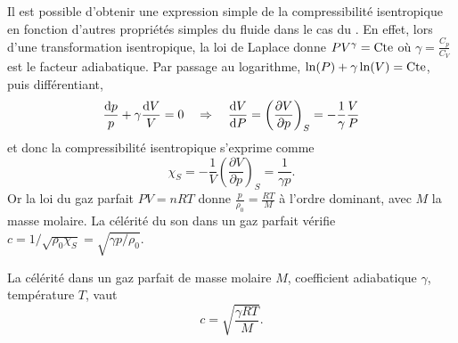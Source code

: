 \documentclass[12pt,fancy]{cours}
\begin{document}
Il est possible d'obtenir une expression simple de la compressibilité isentropique en fonction d'autres propriétés simples du fluide dans le cas du . En effet, lors d'une transformation isentropique, la loi de Laplace donne $PV^{\gamma}=\text{Cte}$ où $\gamma=\frac{C_p}{C_V}$ est le facteur adiabatique. Par passage au logarithme, $\ln(P)+\gamma\ln(V)=\text{Cte}$, puis différentiant,
\begin{equation}
\frac{\mathrm{d} p}{p}+\gamma\frac{\mathrm{d} V}{V}=0\quad\Rightarrow \quad \frac{\mathrm{d} V}{\mathrm{d} P}=\left(\frac{\partial V}{\partial p}\right)_{S}=-\frac{1}{\gamma}\frac{V}{P}
\end{equation}
et donc la compressibilité isentropique s'exprime comme
\begin{equation}
\chi_S=-\frac{1}{V}\left(\frac{\partial V}{\partial p}\right)_{S}=\frac{1}{\gamma p}.
 \end{equation}
Or la loi du gaz parfait $PV=nRT$ donne $\frac{p}{\rho_0}=\frac{RT}{M}$ à l'ordre dominant, avec $M$ la masse molaire. La célérité du son dans un gaz parfait vérifie $c=1/\sqrt{\rho_0 \chi_S} = \sqrt{\gamma p/\rho_0}$.
\begin{theorem}\label{form:}
	La célérité dans un gaz parfait de masse molaire $M$, coefficient adiabatique $\gamma$, température $T$, vaut
	\begin{equation}
	   c=\sqrt{\frac{\gamma RT}{M}}.
   \end{equation}
\end{theorem}
   
\end{document}
